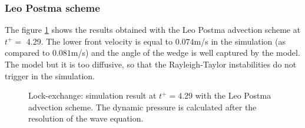 \subsubsection{Leo Postma scheme}
The figure \ref{fig:lock-exchange_dp_no_LP} shows the results obtained with the Leo Postma advection scheme at $t^+=$ 4.29.
The lower front velocity is equal to $0.074$m/s in the simulation (as compared to $0.081$m/s) and the angle of the wedge
is well captured by the model. The model but it is too diffusive, so that the Rayleigh-Taylor instabilities do not trigger in the simulation.
\begin{figure}[ht]
  \begin{center}
    \caption{Lock-exchange: simulation result at $t^+=4.29$ with the Leo Postma advection scheme.
      The dynamic pressure is calculated after the resolution of the wave equation.}
    \label{fig:lock-exchange_dp_no_LP}
  \end{center}
\end{figure}

